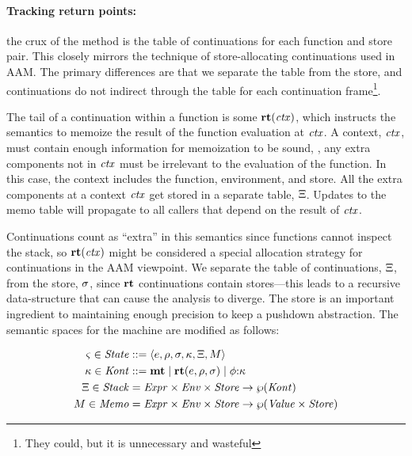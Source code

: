 \paragraph{Tracking return points:} the crux of the method is the table of continuations for each function and store pair.
%
This closely mirrors the technique of store-allocating continuations used in AAM.
%
The primary differences are that we separate the table from the store, and continuations do not indirect through the table for each continuation frame\footnote{They could, but it is unnecessary and wasteful}.

The tail of a continuation within a function is some $\mathbf{rt}(\mathit{ctx})$, which instructs the semantics to memoize the result of the function evaluation at $\mathit{ctx}$.
%
A context, $\mathit{ctx}$, must contain enough information for memoization to be sound, \ie, any extra components not in $\mathit{ctx}$ must be irrelevant to the evaluation of the function.
%
In this case, the context includes the function, environment, and store.
%
All the extra components at a context $\mathit{ctx}$ get stored in a separate table, $\Xi$.
%
Updates to the memo table will propagate to all callers that depend on the result of $\mathit{ctx}$.

Continuations count as ``extra'' in this semantics since functions cannot inspect the stack, so $\mathbf{rt}(\mathit{ctx})$ might be considered a special allocation strategy for continuations in the AAM viewpoint.
%
We separate the table of continuations, $\Xi$, from the store, $\sigma$, since $\mathbf{rt}$ continuations contain stores---this leads to a recursive data-structure that can cause the analysis to diverge.
%
The store is an important ingredient to maintaining enough precision to keep a pushdown abstraction.
%
The semantic spaces for the machine are modified as follows:

\begin{align*}
  \varsigma \in \mathit{State} &::= \langle e,\rho,\sigma,\kappa,\Xi,M \rangle \\
  \kappa \in \mathit{Kont} &::= \mathbf{mt} \mathrel{\mid} \mathbf{rt}(e,\rho,\sigma) \mathrel{\mid} \phi{\tt :} \kappa \\
  \Xi \in \mathit{Stack} &= \mathit{Expr} \times \mathit{Env}\times \mathit{Store} \to \wp(\mathit{Kont}) \\
  M \in \mathit{Memo} &= \mathit{Expr} \times \mathit{Env}\times \mathit{Store} \to \wp(\mathit{Value} \times \mathit{Store})
\end{align*}

